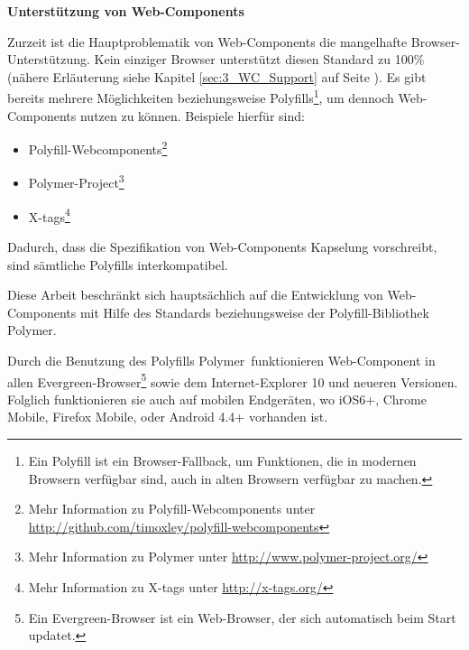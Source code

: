 \textbf{Unterstützung von Web-Components}

Zurzeit ist die Hauptproblematik von Web-Components die mangelhafte Browser-Unterstützung. Kein einziger Browser unterstützt diesen Standard zu 100\% (nähere Erläuterung siehe Kapitel \ref{sec:3_WC_Support} auf Seite \pageref{sec:3_WC_Support}). Es gibt bereits mehrere Möglichkeiten beziehungsweise Polyfills\footnote{Ein Polyfill ist ein Browser-Fallback, um Funktionen, die in modernen Browsern verfügbar sind, auch in alten Browsern verfügbar zu machen.}, um dennoch Web-Components nutzen zu können. Beispiele hierfür sind:
\begin{itemize}
\item Polyfill-Webcomponents\footnote{Mehr Information zu Polyfill-Webcomponents unter \href{http://github.com/timoxley/polyfill-webcomponents}{http://github.com/timoxley/polyfill-webcomponents}}
\item Polymer-Project\footnote{Mehr Information zu Polymer unter \href{http://www.polymer-project.org/}{http://www.polymer-project.org/}}
\item X-tags\footnote{Mehr Information zu X-tags unter \href{http://x-tags.org/}{http://x-tags.org/}}
\end{itemize}

Dadurch, dass die Spezifikation von Web-Components Kapselung vorschreibt, sind sämtliche Polyfills interkompatibel.

Diese Arbeit beschränkt sich hauptsächlich auf die Entwicklung von Web-Components mit Hilfe des Standards beziehungsweise der Polyfill-Bibliothek Polymer.

Durch die Benutzung des Polyfills \glqq Polymer\grqq\ funktionieren Web-Component in allen \glqq Evergreen\grqq -Browser\footnote{Ein \glqq Evergreen\grqq -Browser ist ein Web-Browser, der sich automatisch beim Start updatet.} sowie dem Internet-Explorer 10 und neueren Versionen. Folglich funktionieren sie auch auf mobilen Endgeräten, wo iOS6+, Chrome Mobile, Firefox Mobile, oder Android 4.4+ vorhanden ist.